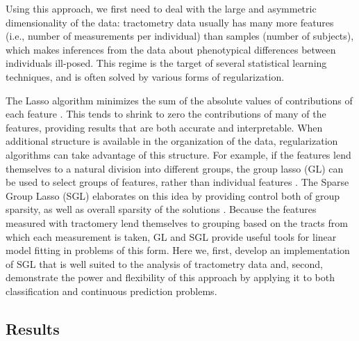 \documentclass[10pt,%
               aps,%
               prl,%
               preprint,%
               superscriptaddress,%
               preprintnumbers,%
               amsmath,%
               floatfix,%
               endfloats*]{revtex4-1}
\begin{document}
Using this approach, we first need to deal with the large and
asymmetric dimensionality of the data: tractometry data usually has
many more features (i.e., number of measurements per individual) than
samples (number of subjects), which makes inferences from the data
about phenotypical differences between individuals ill-posed. This
regime is the target of several statistical learning techniques, and
is often solved by various forms of regularization.


The Lasso algorithm minimizes the sum of the absolute values of
contributions of each feature \cite{Tibshirani1996-qs}. This
tends to shrink to zero the contributions of many of the features,
providing results that are both accurate and interpretable. When
additional structure is available in the organization of the data,
regularization algorithms can take advantage of this structure. For
example, if the features lend themselves to a natural division into
different groups, the group lasso (GL) can be used to select groups
of features, rather than individual features \cite{Yuan2006-ky}.
The Sparse Group Lasso (SGL) elaborates on this idea by providing
control both of group sparsity, as well as overall sparsity of the
solutions \cite{simon2013sgl}. Because the features measured with
tractomery lend themselves to grouping based on the tracts from which
each measurement is taken, GL and SGL provide useful tools
for linear model fitting in problems of this form. Here we, first,
develop an implementation of SGL that is well suited to the analysis of
tractometry data and, second, demonstrate the power and flexibility of
this approach by applying it to both classification
and continuous prediction problems.

\subsection*{Results}
\end{document}
